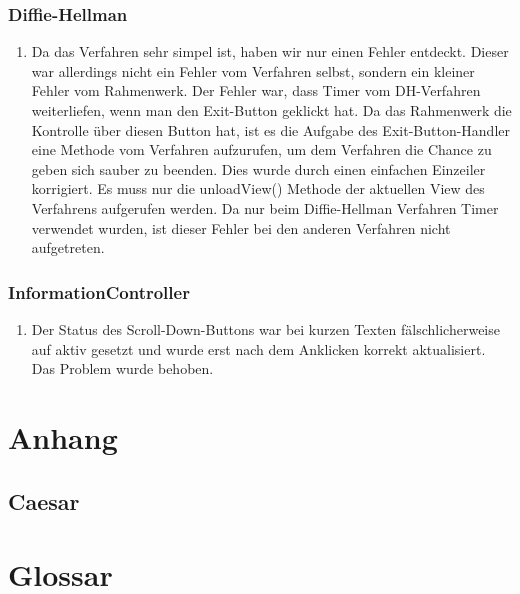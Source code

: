 \documentclass{article}
\begin{document}
     \subsubsection{Diffie-Hellman}
     \begin{enumerate}
         \item Da das Verfahren sehr simpel ist, haben wir nur einen Fehler entdeckt.
             Dieser war allerdings nicht ein Fehler vom Verfahren selbst, sondern
             ein kleiner Fehler vom Rahmenwerk. Der Fehler war, dass Timer vom DH-Verfahren weiterliefen,
             wenn man den Exit-Button geklickt hat. Da das Rahmenwerk die Kontrolle über diesen Button
             hat, ist es die Aufgabe des Exit-Button-Handler eine Methode vom Verfahren aufzurufen,
             um dem Verfahren die Chance zu geben sich sauber zu beenden. Dies wurde
             durch einen einfachen Einzeiler korrigiert. Es muss nur die unloadView() Methode der aktuellen
             View des Verfahrens aufgerufen werden.
             Da nur beim Diffie-Hellman Verfahren Timer verwendet wurden, ist dieser
             Fehler bei den anderen Verfahren nicht aufgetreten.
         \end{enumerate}

    \subsubsection{InformationController}
     \begin{enumerate}
         \item Der Status des Scroll-Down-Buttons war bei kurzen Texten fälschlicherweise auf aktiv gesetzt
         und wurde erst nach dem Anklicken korrekt aktualisiert. Das Problem wurde behoben.
         \end{enumerate}
\clearpage

\section{Anhang}
 \subsection{Caesar}

\clearpage
\section{Glossar}

 \restoregeometry

\glsaddall
\printglossary[numberedsection, style=altlist]
\end{document}
